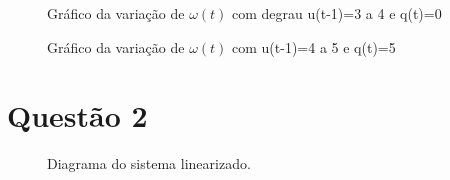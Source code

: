 \documentclass[11pt]{article}
\begin{document}
\begin{figure}[!htb]
	\caption{ Gráfico da variação de $\omega(t)$ com degrau u(t-1)=3 a 4 e q(t)=0}
\end{figure}

\begin{figure}[!htb]
	\caption{ Gráfico da variação de $\omega(t)$ com u(t-1)=4 a 5 e q(t)=5}
\end{figure}

\section{Questão 2}

\begin{figure}[!htb]
	\caption{Diagrama do sistema linearizado.}
\end{figure}
\end{document}
